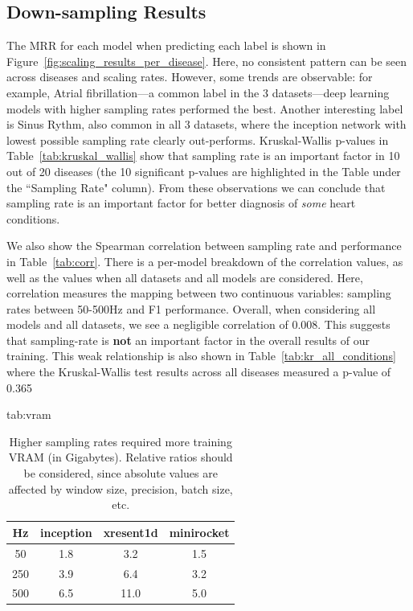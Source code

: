 \documentclass[pmlr,twocolumn]{jmlr}%
\begin{document}
\subsection{Down-sampling Results}
\label{sec:ds_results}
The MRR for each model when predicting each label is shown in Figure~\ref{fig:scaling_results_per_disease}. Here, no consistent pattern can be seen across diseases and scaling rates. However, some trends are observable: for example, Atrial fibrillation---a common label in the 3 datasets---deep learning models with higher sampling rates performed the best. Another interesting label is Sinus Rythm, also common in all 3 datasets,  where the inception network with lowest possible sampling rate clearly out-performs. Kruskal-Wallis p-values in Table~\ref{tab:kruskal_wallis} show that sampling rate is an important factor in 10 out of 20 diseases (the 10 significant p-values are highlighted in the Table under the ``Sampling Rate" column). From these observations we can conclude that sampling rate is an important factor for better diagnosis of \textit{some} heart conditions.

We also show the Spearman correlation between sampling rate and performance in Table~\ref{tab:corr}. There is a per-model breakdown of the correlation values, as well as the values when all datasets and all models are considered. Here, correlation measures the mapping between two continuous variables: sampling rates between 50-500Hz and F1 performance. Overall, when considering all models and all datasets, we see a negligible correlation of $0.008$. This suggests that sampling-rate is \textbf{not} an important factor in the overall results of our training. This weak relationship is also shown in   Table~\ref{tab:kr_all_conditions} where the Kruskal-Wallis test results across all diseases measured a p-value of 0.365
\begin{table}[htbp]
\centering
\floatconts
  {tab:vram}
  {\caption{Higher sampling rates required more training VRAM (in Gigabytes). Relative ratios should be considered, since absolute values are affected by window size, precision, batch size, etc.}}
  {\begin{tabular}{|c|c|c|c|}
  \hline
    \bfseries Hz & \bfseries inception & \bfseries xresent1d & \bfseries minirocket\\
  \hline
    50  & 1.8       & 3.2     & 1.5    \\
    250 & 3.9       & 6.4     & 3.2    \\
    500 & 6.5       & 11.0    & 5.0   \\
  \hline
  \end{tabular}}
\end{table}
\end{document}
